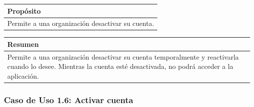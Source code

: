 \begin{table}[H]
    \centering
    \begin{tabularx}{\textwidth}{@{} |L |@{}} \hline
        \textbf{Propósito} \\
        \hline
        Permite a una organización desactivar su cuenta. \\
        \hline
    \end{tabularx}
\end{table}

\begin{table}[H]
    \centering
    \begin{tabularx}{\textwidth}{@{} |L |@{}} \hline
        \textbf{Resumen} \\
        \hline
        Permite a una organización desactivar su cuenta temporalmente y reactivarla cuando lo desee. Mientras
        la cuenta esté desactivada, no podrá acceder a la aplicación. \\
        \hline
    \end{tabularx}
\end{table}

\subsubsection{Caso de Uso 1.6: Activar cuenta}\label{subsubsec:activar-cuenta-org}

